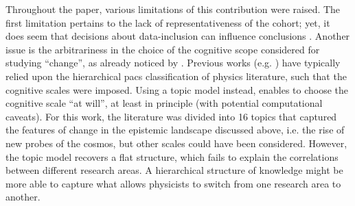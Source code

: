 \documentclass{article}
\begin{document}
Throughout the paper, various limitations of this contribution were raised. The first limitation pertains to the lack of representativeness of the cohort; yet, it does seem that decisions about data-inclusion can influence conclusions \citep{Aleta2019}. Another issue is the arbitrariness in the choice of the cognitive scope considered for studying ``change'', as already noticed by \citet{Gieryn1978}. Previous works (e.g. \citealt{Tripodi2020,Aleta2019,Battiston2019,Jia2017}) have typically relied upon the hierarchical \gls{pacs} classification of physics literature, such that the cognitive scales were imposed. Using a topic model instead, enables to choose the cognitive scale ``at will'', at least in principle (with potential computational caveats). For this work, the literature was divided into 16 topics that captured the features of change in the epistemic landscape discussed above, i.e. the rise of new probes of the cosmos, but other scales could have been considered. However, the topic model recovers a flat structure, which fails to explain the correlations between different research areas. A hierarchical structure of knowledge might be more able to capture what allows physicists to switch from one research area to another.



\end{document}

